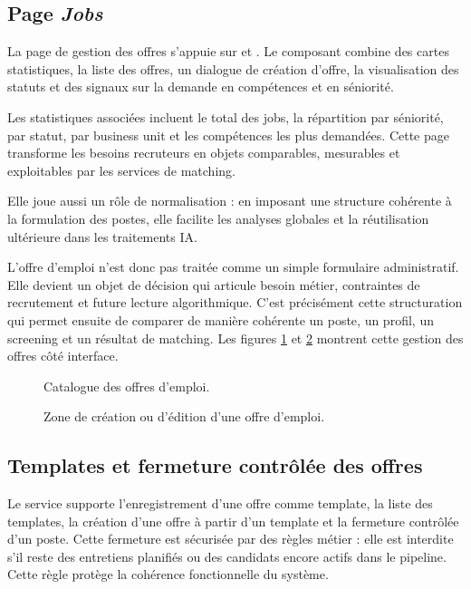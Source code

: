\subsection{Page \textit{Jobs}}
La page de gestion des offres s'appuie sur  et . Le composant  combine des cartes statistiques, la liste des offres, un dialogue de création d'offre, la visualisation des statuts et des signaux sur la demande en compétences et en séniorité.

Les statistiques associées incluent le total des jobs, la répartition par séniorité, par statut, par business unit et les compétences les plus demandées. Cette page transforme les besoins recruteurs en objets comparables, mesurables et exploitables par les services de matching.

Elle joue aussi un rôle de normalisation : en imposant une structure cohérente à la formulation des postes, elle facilite les analyses globales et la réutilisation ultérieure dans les traitements IA.

L'offre d'emploi n'est donc pas traitée comme un simple formulaire administratif. Elle devient un objet de décision qui articule besoin métier, contraintes de recrutement et future lecture algorithmique. C'est précisément cette structuration qui permet ensuite de comparer de manière cohérente un poste, un profil, un screening et un résultat de matching. Les figures \ref{fig:job-management} et \ref{fig:create-job} montrent cette gestion des offres côté interface.

\begin{figure}[H]
  \centering
  \caption{\label{fig:job-management}Catalogue des offres d'emploi.}
\end{figure}

\begin{figure}[H]
  \centering
  \caption{\label{fig:create-job}Zone de création ou d'édition d'une offre d'emploi.}
\end{figure}

\subsection{Templates et fermeture contrôlée des offres}
Le service  supporte l'enregistrement d'une offre comme template, la liste des templates, la création d'une offre à partir d'un template et la fermeture contrôlée d'un poste. Cette fermeture est sécurisée par des règles métier : elle est interdite s'il reste des entretiens planifiés ou des candidats encore actifs dans le pipeline. Cette règle protège la cohérence fonctionnelle du système.

